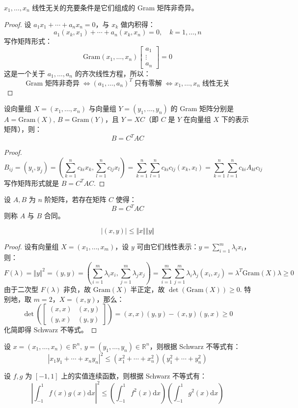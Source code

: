 \begin{definition}
$x_1,\ldots,x_n$ 线性无关的充要条件是它们组成的 Gram 矩阵非奇异。
\end{definition}
\begin{proof}
设 $a_1x_1+\cdots+a_nx_n=0$，与 $x_k$ 做内积得：
\[
    a_1(x_k,x_1)+\cdots+a_n(x_k,x_n)=0,\quad k=1,\ldots,n
\]
写作矩阵形式：
\[
    \text{Gram}(x_1,\ldots,x_n)\begin{bmatrix}a_1\\\vdots\\a_n\end{bmatrix}=0
\]
这是一个关于 $a_1,\ldots,a_n$ 的齐次线性方程，所以：
\[
\text{Gram 矩阵非奇异}\;\iff (a_1,\ldots,a_n)^T \;\text{只有零解}\; \iff x_1,\ldots,x_n\;\text{线性无关}
\]
\end{proof}

\begin{theorem}
设向量组 $X=(x_1,\ldots,x_n)$ 与向量组 $Y=(y_1,\ldots,y_n)$ 的 Gram 矩阵分别是 $A=\text{Gram}(X),\,B=\text{Gram}(Y)$，且 $Y=XC$（即 $C$ 是 $Y$ 在向量组 $X$ 下的表示矩阵），则：
\[
    B=C^TAC
\]
\end{theorem}
\begin{proof}
\[
    B_{ij}=(y_i,y_j)=\left(\sum_{k=1}^nc_{ki}x_k,\sum_{l=1}^nc_{lj}x_l\right)=\sum_{k=1}^n\sum_{l=1}^nc_{ki}c_{lj}(x_k,x_l)=\sum_{k=1}^n\sum_{l=1}^nc_{ki}A_{kl}c_{lj}
\]
写作矩阵形式就是 $B=C^TAC$.
\end{proof}

\begin{definition}[合同]
设 $A,B$ 为 $n$ 阶矩阵，若存在矩阵 $C$ 使得：
\[
B=C^TAC
\]
则称 $A$ 与 $B$ 合同。
\end{definition}

\begin{theorem}
\[
    |(x,y)|\leq \Vert x\Vert\Vert y\Vert
\]
\end{theorem}
\begin{proof}
设有向量组 $X=(x_1,\ldots,x_m)$，设 $y$ 可由它们线性表示：$y=\sum_{i=1}^m\lambda_ix_i$，则：
\[
F(\lambda)=\Vert y\Vert^2=(y,y)=\left(\sum_{i=1}^m\lambda_ix_i,\sum_{j=1}^m\lambda_jx_j\right)=\sum_{i=1}^m\sum_{j=1}^m\lambda_i\lambda_j(x_i,x_j)=\lambda^T \text{Gram}(X)\lambda\geq0
\]
由于二次型 $F(\lambda)$ 非负，故 $\text{Gram}(X)$ 半正定，故 $\det(\text{Gram}(X))\geq 0$.
特别地，取 $m=2$，$X=(x,y)$，那么：
$$
\det\left(\begin{bmatrix}(x,x)&(x,y)\\(y,x)&(y,y)\end{bmatrix}\right)=(x,x)(y,y)-(x,y)(y,x)\geq 0
$$
化简即得 Schwarz 不等式。
\end{proof}
\begin{example}
设 $x=(x_1,\ldots,x_n)\in\mathbb R^n,\,y=(y_1,\ldots,y_n)\in\mathbb R^n$，则根据 Schwarz 不等式有：
\[
    |x_1y_1+\cdots+x_ny_n|^2\leq (x_1^2+\cdots+x_n^2)(y_1^2+\cdots+y_n^2)
\]
\end{example}
\begin{example}
设 $f,g$ 为 $[-1,1]$ 上的实值连续函数，则根据 Schwarz 不等式有：
\[
    \left|\int_{-1}^1f(x)g(x)\mathrm dx\right|^2\leq \left(\int_{-1}^1f^2(x)\mathrm dx\right)\left(\int_{-1}^1g^2(x)\mathrm dx\right)
\]
\end{example}

